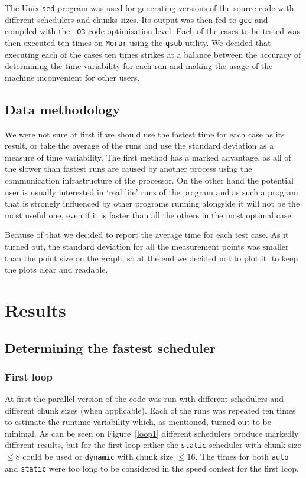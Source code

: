 \documentclass[11pt,a4paper]{article}
\begin{document}
The Unix \texttt{sed} program was used for generating versions of the source code with different schedulers and chunks sizes. Its output was then fed to \texttt{gcc} and compiled with the \texttt{-O3} code optimisation level. Each of the cases to be tested was then executed ten times on \texttt{Morar} using the \texttt{qsub} utility. We decided that executing each of the cases ten times strikes at a balance between the accuracy of determining the time variability for each run and making the usage of the machine inconvenient for other users.

\subsection{Data methodology}
We were not sure at first if we should use the fastest time for each case as its result, or take the average of the runs and use the standard deviation as a measure of time variability. The first method has a marked advantage, as all of the slower than fastest runs are caused by another process using the communication infrastructure of the processor. On the other hand the potential user is usually interested in `real life' runs of the program and as such a program that is strongly influenced by other programs running alongside it will not be the most useful one, even if it is faster than all the others in the most optimal case. 

Because of that we decided to report the average time for each test case. As it turned out, the standard deviation for all the measurement points was smaller than the point size on the graph, so at the end we decided not to plot it, to keep the plots clear and readable.

\section{Results}
\subsection{Determining the fastest scheduler}
\subsubsection{First loop}
At first the parallel version of the code was run with different schedulers and different chunk sizes (when applicable). Each of the runs was repeated ten times to estimate the runtime variability which, as mentioned, turned out to be minimal. As can be seen on Figure~\ref{loop1} different schedulers produce markedly different results, but for the first loop either the \texttt{static} scheduler with chunk size \(\leq 8\) could be used or \texttt{dynamic} with chunk size \(\leq 16\). The times for both \texttt{auto} and \texttt{static} were too long to be considered in the speed contest for the first loop.
\end{document}
